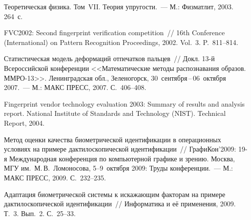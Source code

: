 \begin{multicols}{2}
{{\begin{thebibliography}{99}
Теоретическая физика. Том~VII. Теория упругости.~--- 
М.: Физматлит, 2003.  264~с.

FVC2002: Second 
fingerprint verification competition~// 16th  Conference  (International)
on Pattern Recognition Proceedings, 2002.  Vol.~3. P.~811--814.

Статистическая модель деформаций отпечатков пальцев~// Докл. 
13-й Всероссийской конференции <<Математические методы распознавания 
образов. ММРО-13>>. Ленинградская обл., Зеленогорск, 30~сентября\,--\,06~октября 
2007.~--- М.: МАКС ПРЕСС, 2007. С.~406--408.

Fingerprint vendor technology evaluation 2003: 
Summary of results and analysis report. National Institute of Standards and Technology 
(NIST). Technical Report, 2004.

Метод оценки качества биометрической идентификации 
в операционных условиях на примере дактилоскопической идентификации~// 
ГрафиКон'2009: 19-я Международная конференция по компьютерной графике и 
зрению. Москва, МГУ им.\ М.\,В.~Ломоносова, 5--9~октября 2009: Труды 
конференции.~--- М.: МАКС ПРЕСС, 2009. С.~232--235.

\label{end\stat}

Адаптация биометрической системы к искажающим факторам на 
примере дактилоскопической идентификации~// Информатика и её применения, 
2009. Т.~3. Вып.~2. С.~25--33.
 \end{thebibliography}
}
}
\end{multicols}